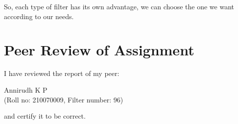 \documentclass{article}
\begin{document}
So, each type of filter has its own advantage, we can choose the one we want according to our needs.

\section{Peer Review of Assignment}

I have reviewed the report of my peer:

\begin{center}
    Annirudh K P\\
    (Roll no: 210070009, Filter number: 96)
\end{center}
and certify it to be correct.
\end{document}
